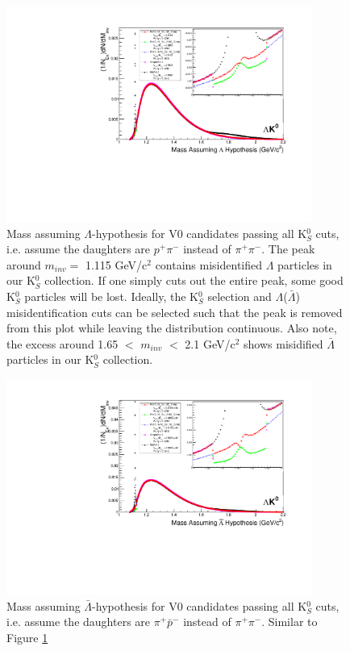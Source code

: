 \documentclass[../AnalysisNoteJBuxton.tex]{subfiles}
\begin{document}
\begin{figure}[h]
  \centering
  \includegraphics[width=100mm]{3_DataSelection/Figures/MassAssHypotheses/canMassAssLamHypCompare_LamK0_wNoMisID.pdf}
  \caption[$\Lambda$ contamination in K$^{0}_{S}$ collection]{Mass assuming $\Lambda$-hypothesis for V0 candidates passing all K$^{0}_{S}$ cuts, i.e. assume the daughters are $p^{+}\pi^{-}$ instead of $\pi^{+}\pi^{-}$.
  The peak around $m_{inv} = $ 1.115 GeV/c$^{2}$ contains misidentified $\Lambda$ particles in our K$^{0}_{S}$ collection.
  If one simply cuts out the entire peak, some good K$^{0}_{S}$ particles will be lost.  Ideally, the K$^{0}_{S}$ selection and $\Lambda$($\bar{\Lambda}$) misidentification cuts can be selected such that the peak is removed from this plot while leaving the distribution continuous.
  Also note, the excess around 1.65 $<$ $m_{inv}$ $<$ 2.1 GeV/c$^{2}$ shows misidified $\bar{\Lambda}$ particles in our K$^{0}_{S}$ collection.}
  \label{fig:MassAssLamHyp}
\end{figure}


\begin{figure}[h]
  \centering
  \includegraphics[width=100mm]{3_DataSelection/Figures/MassAssHypotheses/canMassAssALamHypCompare_LamK0_wNoMisID.pdf}
  \caption[$\bar{\Lambda}$ contamination in K$^{0}_{S}$ collection]{Mass assuming $\bar{\Lambda}$-hypothesis for V0 candidates passing all K$^{0}_{S}$ cuts, i.e. assume the daughters are $\pi^{+}\bar{p}^{-}$ instead of $\pi^{+}\pi^{-}$.  Similar to Figure \ref{fig:MassAssLamHyp}}
  \label{fig:MassAssALamHyp}
\end{figure}
\end{document}

